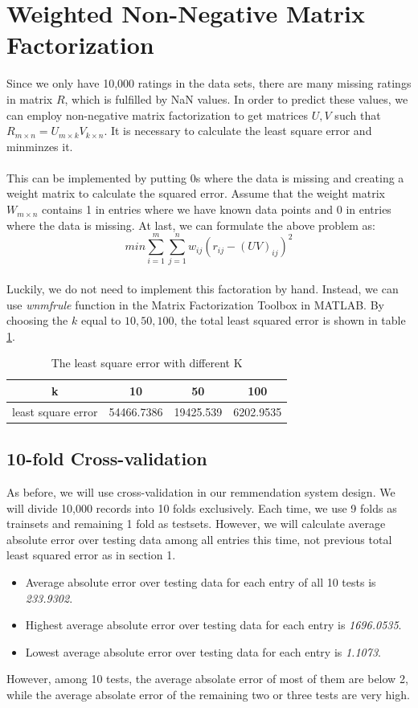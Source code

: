 \documentclass{article}
\begin{document}
\section{Weighted Non-Negative Matrix Factorization}
Since we only have 10,000 ratings in the data sets, there are many missing ratings in matrix $R$, which is fulfilled by NaN values. In order to predict these values, we can employ non-negative matrix factorization to get matrices $U, V$ such that $R_{m \times n}=U_{m \times k}V_{k \times n}$. It is necessary to calculate the least square error and minminzes it.\\
\\
This can be implemented by putting 0s where the data is missing and creating a weight matrix to calculate the squared error. Assume that the weight matrix $W_{m \times n}$ contains 1 in entries where we have known data points and 0 in entries where the data is missing. At last, we can formulate the above problem as:
\begin{equation*}
min\sum_{i=1}^{m}\sum_{j=1}^{n}w_{ij}{(r_{ij}-{(UV)}_{ij})}^2
\end{equation*}
\\
Luckily, we do not need to implement this factoration by hand. Instead, we can use \emph{wnmfrule} function in the Matrix Factorization Toolbox in MATLAB. By choosing the $k$ equal to $10, 50, 100$, the total least squared error is shown in table \ref{tb:k}.
\begin{table}
\begin{center}
\caption{The least square error with different K}
\label{tb:k}
\begin{tabular}{|c|c|c|c|}
\hline
k& 10& 50 & 100\\
\hline
least square error&54466.7386&19425.539&6202.9535\\
\hline
\end{tabular}
\end{center}
\end{table}
\subsection{10-fold Cross-validation}
As before, we will use cross-validation in our remmendation system design. We will divide 10,000 records into 10 folds exclusively. Each time, we use 9 folds as trainsets and remaining 1 fold as testsets. However, we will calculate average absolute error over testing data among all entries this time, not previous total least squared error as in section 1.
\begin{itemize}
\item Average absolute error over testing data for each entry of all 10 tests is \emph{233.9302}.
\item Highest average absolute error over testing data for each entry is \emph{1696.0535}.
\item Lowest average absolute error over testing data for each entry is \emph{1.1073}.
\end{itemize}
However, among 10 tests, the average absolate error of most of them are below 2, while the average absolate error of the remaining two or three tests are very high.
\end{document}
